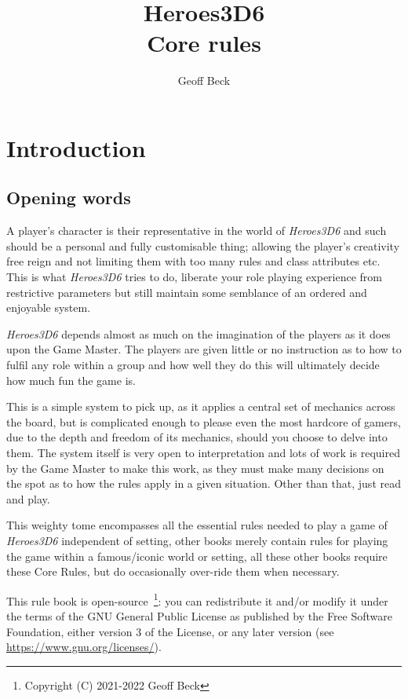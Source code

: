 \documentclass[a4paper,10pt,oneside]{book}
\title{\textbf{\huge Heroes3D6\\Core rules}}
\author{Geoff Beck}
\date{}
\begin{document}
\maketitle
\frontmatter
\tableofcontents
\mainmatter

\chapter{Introduction}

\section{Opening words}
A player's character is their representative in the world of \textit{Heroes3D6} and such should be a personal and fully customisable thing; allowing the player's creativity free reign and not limiting them with too many rules and class attributes etc. This is what \textit{Heroes3D6} tries to do, liberate your role playing experience from restrictive parameters but still maintain some semblance of an ordered and enjoyable system.

\textit{Heroes3D6} depends almost as much on the imagination of the players as it does upon the Game Master. The players are given little or no instruction as to how to fulfil any role within a group and how well they do this will ultimately decide how much fun the game is.

This is a simple system to pick up, as it applies a central set of mechanics across the board, but is complicated enough to please even the most hardcore of gamers, due to the depth and freedom of its mechanics, should you choose to delve into them. The system itself is very open to interpretation and lots of work is required by the Game Master to make this work, as they must make many decisions on the spot as to how the rules apply in a given situation. Other than that, just read and play.

This weighty tome encompasses all the essential rules needed to play a game of \textit{Heroes3D6} independent of setting, other books merely contain rules for playing the game within a famous/iconic world or setting, all these other books require these Core Rules, but do occasionally over-ride them when necessary.

This rule book is open-source~\footnote{Copyright (C) 2021-2022  Geoff Beck}: you can redistribute it and/or modify
it under the terms of the GNU General Public License as published by
the Free Software Foundation, either version 3 of the License, or any later version (see \url{https://www.gnu.org/licenses/}).
\end{document}

